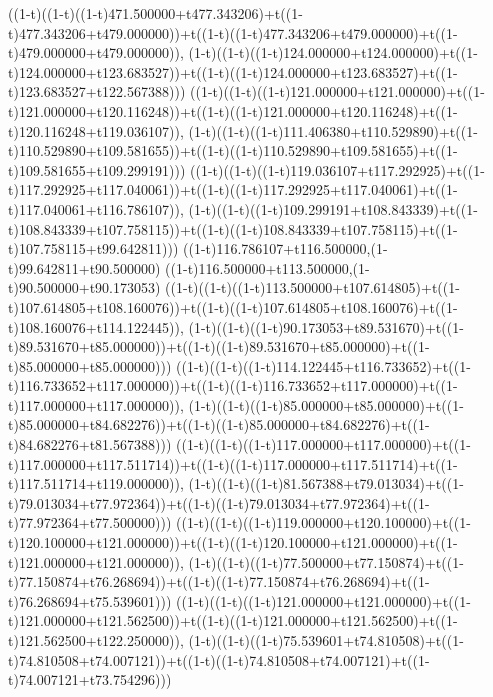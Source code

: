 ((1-t)((1-t)((1-t)471.500000+t477.343206)+t((1-t)477.343206+t479.000000))+t((1-t)((1-t)477.343206+t479.000000)+t((1-t)479.000000+t479.000000)),                                     (1-t)((1-t)((1-t)124.000000+t124.000000)+t((1-t)124.000000+t123.683527))+t((1-t)((1-t)124.000000+t123.683527)+t((1-t)123.683527+t122.567388)))
((1-t)((1-t)((1-t)121.000000+t121.000000)+t((1-t)121.000000+t120.116248))+t((1-t)((1-t)121.000000+t120.116248)+t((1-t)120.116248+t119.036107)),                                     (1-t)((1-t)((1-t)111.406380+t110.529890)+t((1-t)110.529890+t109.581655))+t((1-t)((1-t)110.529890+t109.581655)+t((1-t)109.581655+t109.299191)))
((1-t)((1-t)((1-t)119.036107+t117.292925)+t((1-t)117.292925+t117.040061))+t((1-t)((1-t)117.292925+t117.040061)+t((1-t)117.040061+t116.786107)),                                     (1-t)((1-t)((1-t)109.299191+t108.843339)+t((1-t)108.843339+t107.758115))+t((1-t)((1-t)108.843339+t107.758115)+t((1-t)107.758115+t99.642811)))
((1-t)116.786107+t116.500000,(1-t)99.642811+t90.500000)
((1-t)116.500000+t113.500000,(1-t)90.500000+t90.173053)
((1-t)((1-t)((1-t)113.500000+t107.614805)+t((1-t)107.614805+t108.160076))+t((1-t)((1-t)107.614805+t108.160076)+t((1-t)108.160076+t114.122445)),                                     (1-t)((1-t)((1-t)90.173053+t89.531670)+t((1-t)89.531670+t85.000000))+t((1-t)((1-t)89.531670+t85.000000)+t((1-t)85.000000+t85.000000)))
((1-t)((1-t)((1-t)114.122445+t116.733652)+t((1-t)116.733652+t117.000000))+t((1-t)((1-t)116.733652+t117.000000)+t((1-t)117.000000+t117.000000)),                                     (1-t)((1-t)((1-t)85.000000+t85.000000)+t((1-t)85.000000+t84.682276))+t((1-t)((1-t)85.000000+t84.682276)+t((1-t)84.682276+t81.567388)))
((1-t)((1-t)((1-t)117.000000+t117.000000)+t((1-t)117.000000+t117.511714))+t((1-t)((1-t)117.000000+t117.511714)+t((1-t)117.511714+t119.000000)),                                     (1-t)((1-t)((1-t)81.567388+t79.013034)+t((1-t)79.013034+t77.972364))+t((1-t)((1-t)79.013034+t77.972364)+t((1-t)77.972364+t77.500000)))
((1-t)((1-t)((1-t)119.000000+t120.100000)+t((1-t)120.100000+t121.000000))+t((1-t)((1-t)120.100000+t121.000000)+t((1-t)121.000000+t121.000000)),                                     (1-t)((1-t)((1-t)77.500000+t77.150874)+t((1-t)77.150874+t76.268694))+t((1-t)((1-t)77.150874+t76.268694)+t((1-t)76.268694+t75.539601)))
((1-t)((1-t)((1-t)121.000000+t121.000000)+t((1-t)121.000000+t121.562500))+t((1-t)((1-t)121.000000+t121.562500)+t((1-t)121.562500+t122.250000)),                                     (1-t)((1-t)((1-t)75.539601+t74.810508)+t((1-t)74.810508+t74.007121))+t((1-t)((1-t)74.810508+t74.007121)+t((1-t)74.007121+t73.754296)))
